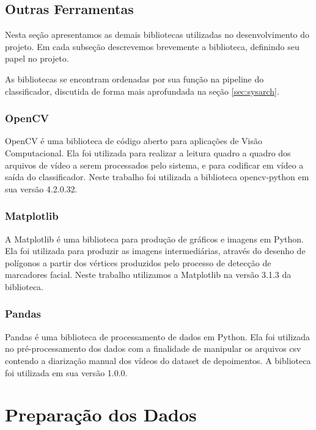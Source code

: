 \subsection{Outras Ferramentas}
\label{subsec:otools}

Nesta seção apresentamos as demais bibliotecas utilizadas no desenvolvimento do projeto. Em cada subseção descrevemos brevemente a biblioteca, definindo seu papel no projeto.

As bibliotecas se encontram ordenadas por sua função na pipeline do classificador, discutida de forma mais aprofundada na seção \ref{sec:sysarch}.

\subsubsection{OpenCV}

OpenCV\cite{opencv_library} é uma biblioteca de código aberto para aplicações de Visão Computacional. Ela foi utilizada para realizar a leitura quadro a quadro dos arquivos de vídeo a serem processados pelo sistema, e para codificar em vídeo a saída do classificador. Neste trabalho foi utilizada a biblioteca opencv-python em sua versão 4.2.0.32.

\subsubsection{Matplotlib}

A Matplotlib\cite{hunterMatplotlib2DGraphics2007} é uma biblioteca para produção de gráficos e imagens em Python. Ela foi utilizada para produzir as imagens intermediárias, através do desenho de polígonos a partir dos vértices produzidos pelo processo de detecção de marcadores facial. Neste trabalho utilizamos a Matplotlib na versão 3.1.3 da biblioteca.

\subsubsection{Pandas}

Pandas\cite{mckinney-proc-scipy-2010} é uma biblioteca de processamento de dados em Python. Ela foi utilizada no pré-processamento dos dados com a finalidade de manipular os arquivos csv contendo a diarização manual dos vídeos do dataset de depoimentos. A biblioteca foi utilizada em sua versão 1.0.0.

\section{Preparação dos Dados}
\label{sec:preproc}

